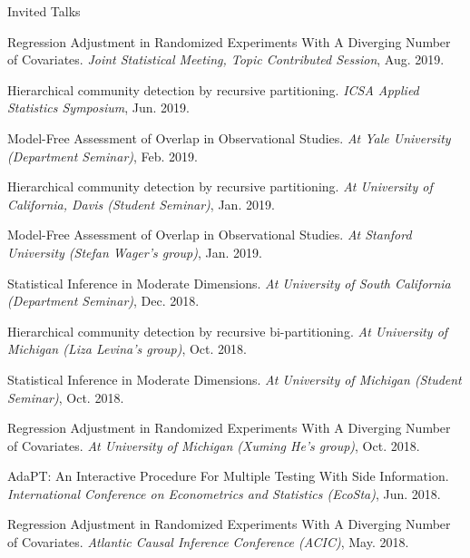 \documentclass{article}
\begin{document}
\begin{large}
\noindent Invited Talks
\end{large}

\vspace{2mm}
Regression Adjustment in Randomized Experiments With A Diverging Number of Covariates. \emph{Joint Statistical Meeting, Topic Contributed Session}, Aug. 2019.

\vspace{2mm}
Hierarchical community detection by recursive partitioning. \emph{ICSA Applied Statistics Symposium}, Jun. 2019.

\vspace{2mm}
Model-Free Assessment of Overlap in Observational Studies. \emph{At Yale University (Department Seminar)}, Feb. 2019.

\vspace{2mm}
Hierarchical community detection by recursive partitioning. \emph{At University of California, Davis (Student Seminar)}, Jan. 2019.

\vspace{2mm}
Model-Free Assessment of Overlap in Observational Studies. \emph{At Stanford University (Stefan Wager's group)}, Jan. 2019.

\vspace{2mm}
Statistical Inference in Moderate Dimensions. \emph{At University of South California (Department Seminar)}, Dec. 2018.

\vspace{2mm}
Hierarchical community detection by recursive bi-partitioning. \emph{At University of Michigan (Liza Levina's group)}, Oct. 2018.

\vspace{2mm}
Statistical Inference in Moderate Dimensions. \emph{At University of Michigan (Student Seminar)}, Oct. 2018.

\vspace{2mm}
Regression Adjustment in Randomized Experiments With A Diverging Number of Covariates. \emph{At University of Michigan (Xuming He's group)}, Oct. 2018.

\vspace{2mm}
AdaPT: An Interactive Procedure For Multiple Testing With Side Information. \emph{International Conference on Econometrics and Statistics (EcoSta)}, Jun. 2018.

\vspace{2mm}
Regression Adjustment in Randomized Experiments With A Diverging Number of Covariates. \emph{Atlantic Causal Inference Conference (ACIC)}, May. 2018.
\end{document}
